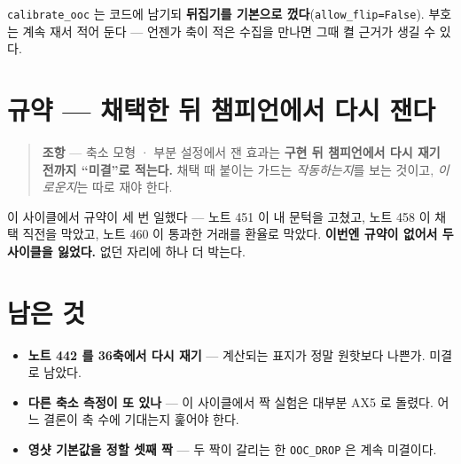 \documentclass[11pt]{article}
\begin{document}
\texttt{calibrate\_ooc} 는 코드에 남기되 \textbf{뒤집기를 기본으로
껐다}(\texttt{allow\_flip=False}). 부호는 계속 재서 적어 둔다 --- 언젠가
축이 적은 수집을 만나면 그때 켤 근거가 생길 수 있다.

\section*{규약 --- 채택한 뒤 챔피언에서 다시 잰다}

\begin{quote}
\textbf{조항} --- 축소 모형 · 부분 설정에서 잰 효과는 \textbf{구현 뒤
챔피언에서 다시 재기 전까지 ``미결''로 적는다.} 채택 때 붙이는 가드는
\emph{작동하는지}를 보는 것이고, \emph{이로운지}는 따로 재야 한다.
\end{quote}

이 사이클에서 규약이 세 번 일했다 --- 노트 451 이 내 문턱을 고쳤고,
노트 458 이 채택 직전을 막았고, 노트 460 이 통과한 거래를 환율로 막았다.
\textbf{이번엔 규약이 없어서 두 사이클을 잃었다.} 없던 자리에 하나 더
박는다.

\section*{남은 것}

\begin{itemize}
\item \textbf{노트 442 를 36축에서 다시 재기} --- 계산되는 표지가 정말
원핫보다 나쁜가. 미결로 남았다.
\item \textbf{다른 축소 측정이 또 있나} --- 이 사이클에서 짝 실험은
대부분 AX5 로 돌렸다. 어느 결론이 축 수에 기대는지 훑어야 한다.
\item \textbf{영샷 기본값을 정할 셋째 짝} --- 두 짝이 갈리는 한
\texttt{OOC\_DROP} 은 계속 미결이다.
\end{itemize}
\end{document}
